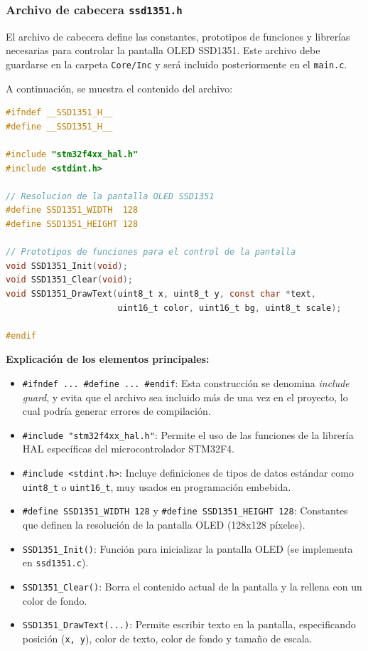 \documentclass[a4paper,12pt]{article}
\begin{document}
\subsubsection{Archivo de cabecera \texttt{ssd1351.h}}

El archivo de cabecera define las constantes, prototipos de funciones y librerías necesarias para controlar la pantalla OLED SSD1351.  
Este archivo debe guardarse en la carpeta \texttt{Core/Inc} y será incluido posteriormente en el \texttt{main.c}.  

A continuación, se muestra el contenido del archivo:

\newpage

\begin{lstlisting}[language=C, caption={Código del archivo \texttt{ssd1351.h}}, label={cod:ssd1351_h}]
#ifndef __SSD1351_H__
#define __SSD1351_H__

#include "stm32f4xx_hal.h"
#include <stdint.h>

// Resolucion de la pantalla OLED SSD1351
#define SSD1351_WIDTH  128
#define SSD1351_HEIGHT 128

// Prototipos de funciones para el control de la pantalla
void SSD1351_Init(void);
void SSD1351_Clear(void);
void SSD1351_DrawText(uint8_t x, uint8_t y, const char *text,
                      uint16_t color, uint16_t bg, uint8_t scale);

#endif
\end{lstlisting}

\noindent
\textbf{Explicación de los elementos principales:}
\begin{itemize}
    \item \verb|#ifndef ... #define ... #endif|: Esta construcción se denomina \emph{include guard}, y evita que el archivo sea incluido más de una vez en el proyecto, lo cual podría generar errores de compilación.
    \item \verb|#include "stm32f4xx_hal.h"|: Permite el uso de las funciones de la librería HAL específicas del microcontrolador STM32F4.
    \item \verb|#include <stdint.h>|: Incluye definiciones de tipos de datos estándar como \verb|uint8_t| o \verb|uint16_t|, muy usados en programación embebida.
    \item \verb|#define SSD1351_WIDTH 128| y \verb|#define SSD1351_HEIGHT 128|: Constantes que definen la resolución de la pantalla OLED (128x128 píxeles).
    \item \verb|SSD1351_Init()|: Función para inicializar la pantalla OLED (se implementa en \texttt{ssd1351.c}).
    \item \verb|SSD1351_Clear()|: Borra el contenido actual de la pantalla y la rellena con un color de fondo.
    \item \verb|SSD1351_DrawText(...)|: Permite escribir texto en la pantalla, especificando posición (\verb|x, y|), color de texto, color de fondo y tamaño de escala.
\end{itemize}
\end{document}
